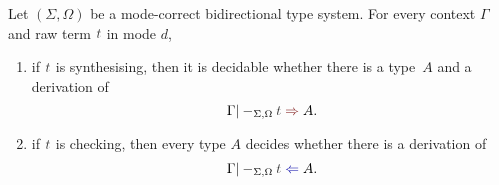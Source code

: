\begin{theorem} \label{thm:bidirectional-type-synthesis-checking}
  Let $(\Sigma, \Omega)$ be a mode-correct bidirectional type system.
  For every context $\Gamma$ and raw term $\isTerm{t}$ in mode $d$, 
  \begin{enumerate}
    \item if $\isTerm{t}$ is synthesising, then it is decidable whether there is a type~$A$ and a derivation of
      \[
        \Gamma |-_{\Sigma, \Omega} \isTerm{t} \syn A.
      \]
    \item if $\isTerm{t}$ is checking, then every type $A$ decides whether there is a derivation of
      \[
        \Gamma |-_{\Sigma, \Omega} \isTerm{t} \chk A.
      \]
  \end{enumerate}
\end{theorem}

